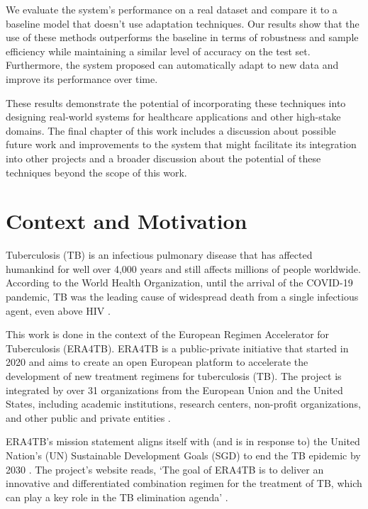 \documentclass[../main.tex]{subfiles}
\begin{document}
 We evaluate the system's performance on a real dataset and compare it to a baseline model that doesn't use adaptation techniques.  Our results show that the use of these methods outperforms the baseline in terms of robustness and sample efficiency while maintaining a similar level of accuracy on the test set. Furthermore, the system proposed can automatically adapt to new data and improve its performance over time. 
 
 These results demonstrate the potential of incorporating these techniques into designing real-world systems for healthcare applications and other high-stake domains. The final chapter of this work includes a discussion about possible future work and improvements to the system that might facilitate its integration into other projects and a broader discussion about the potential of these techniques beyond the scope of this work.
    
 \section{Context and Motivation} \label{sec:motivation}

    Tuberculosis (TB) is an infectious pulmonary disease that has affected humankind for well over 4,000 years \cite{cdctb_world_2023} and still affects millions of people worldwide. According to the World Health Organization, until the arrival of the COVID-19 pandemic, TB was the leading cause of widespread death from a single infectious agent, even above HIV \cite{who_global_2022}.


    This work is done in the context of the European Regimen Accelerator for Tuberculosis (ERA4TB). ERA4TB is a public-private initiative that started in 2020 and aims to create an open European platform to accelerate the development of new treatment regimens for tuberculosis (TB). The project is integrated by over 31 organizations from the European Union and the United States, including academic institutions, research centers, non-profit organizations, and other public and private entities \cite{noauthor_era4tb}.
    
    ERA4TB's mission statement aligns itself with (and is in response to) the United Nation's (UN) Sustainable Development Goals (SGD) to end the TB epidemic by 2030 \cite{world_health_organization_regional_office_for_europe_tuberculosis_2017}. The project's website reads, `The goal of ERA4TB is to deliver an innovative and differentiated combination regimen for the treatment of TB, which can play a key role in the TB elimination agenda' \cite{noauthor_era4tb}.
\end{document}
